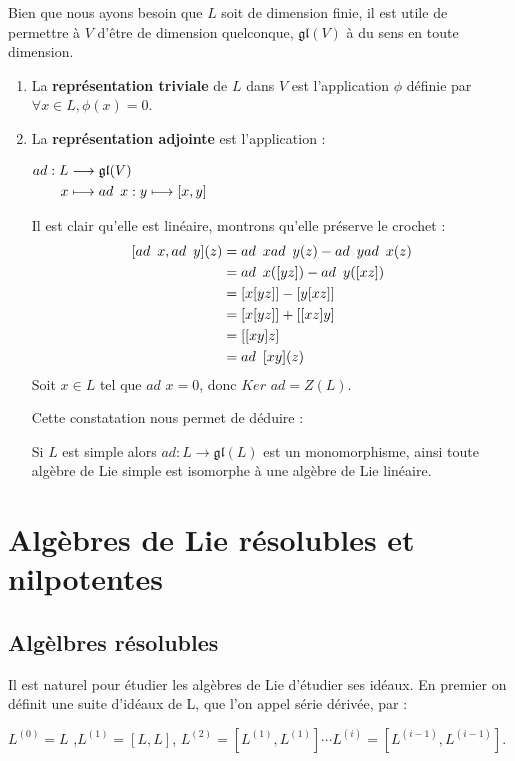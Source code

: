 \documentclass[a4paper,openany,12pt]{report}
\newcommand{\gl}{\mathfrak{gl}}
\theoremstyle{break}
{\theorembodyfont{\upshape}
\newtheorem*{rmq}{Remarque :}
\newtheorem*{prv}{Preuve :}
\newtheorem*{ex}{Exemples :}
\newtheorem*{exe}{Exemple : }
\newtheorem*{nota}{Notation :}
\newtheorem*{dem}{D\'emonstration :}}
\begin{document}
Bien que nous ayons besoin que $L$ soit de dimension finie, il est utile de permettre à $V$ d'être de dimension quelconque, $\gl(V)$ à du sens en toute dimension.
\begin{ex}
\begin{enumerate}

\item La \textbf{représentation triviale} de $L$ dans $V$ est l'application $\phi$ définie par $\forall x \in L , \phi(x)=0$.

\item La \textbf{représentation adjointe} est l'application :
\begin{center}
$
\begin{aligned}
ad : L & \longrightarrow \gl(V) \\
x & \longmapsto ad \enskip x : y\longmapsto [x,y]
\end{aligned}$
\end{center}
Il est clair qu'elle est linéaire, montrons qu'elle préserve le crochet :
\[
\begin{aligned}
[ad \enskip x, ad \enskip y](z) & = ad \enskip x ad \enskip y(z)- ad \enskip y ad \enskip x(z) \\
& = ad \enskip x([y z])-ad \enskip y([x z]) \\
& = [x[y z]]-[y[x z]] \\
& = [x[y z]]+[[x z] y] \\
& = [[x y] z] \\
& = ad \enskip [x y](z)
\end{aligned} \]
Soit $x \in L$ tel que $ad$ $x=0$, donc $Ker$ $ad = Z(L)$. 

Cette constatation nous permet de déduire :

\quad Si $L$ est simple alors $ad: L \longrightarrow \gl(L)$ est un monomorphisme, ainsi toute algèbre de Lie simple est isomorphe à une algèbre de Lie linéaire.
\end{enumerate}
\end{ex}

\section{Algèbres de Lie résolubles et nilpotentes}

\subsection{Algèlbres résolubles}

\quad Il est naturel pour étudier les algèbres de Lie d'étudier ses idéaux. En premier on définit une suite d'idéaux de L, que l'on appel série dérivée, par :
\begin{center}
$L^{(0)} = L$ ,$L^{(1)} = [L,L]$, $L^{(2)} = [L^{(1)},L^{(1)}] \cdots L^{(i)} = [L^{(i-1)},L^{(i-1)}]$.
\end{center}
\end{document}
